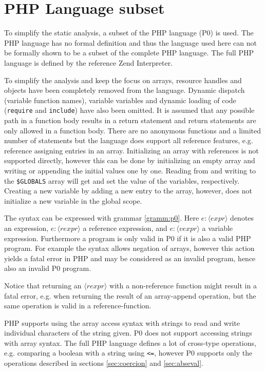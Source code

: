 \section{PHP Language subset}
\newcommand{\syn}[1]{\langle\mathit{#1}\rangle}
\label{sec:langsubset}
To simplify the static analysis, a subset of the PHP language (P0) is used. The PHP language has no formal definition and thus the language used here can not be formally shown to be a subset of the complete PHP language. The full PHP language is defined by the reference Zend Interpreter.

To simplify the analysis and keep the focus on arrays, resource handles and objects have been completely removed from the language. Dynamic dispatch (variable function names), variable variables and dynamic loading of code (\texttt{require} and \texttt{include}) have also been omitted. It is assumed that any possible path in a function body results in a return statement and return statements are only allowed in a function body. There are no anonymous functions and a limited number of statements but the language does support all reference features, e.g. reference assigning entries in an array. Initializing an array with references is not supported directly, however this can be done by initializing an empty array and writing or appending the initial values one by one. Reading from and writing to the \texttt{\$GLOBALS} array will get and set the value of the variables, respectively. Creating a new variable by adding a new entry to the array, however, does not initialize a new variable in the global scope.

The syntax can be expressed with grammar \ref{gramm:p0}. Here $e : \syn{expr}$ denotes an expression, $e : \syn{rexpr}$ a reference expression, and $e : \syn{vexpr}$ a variable expression.   Furthermore a program is only valid in P0 if it is also a valid PHP program. For example the syntax allows negation of arrays, however this action yields a fatal error in PHP and may be considered as an invalid program, hence also an invalid P0 program. 

Notice that returning an $\syn{rexpr}$ with a non-reference function might result in a fatal error, e.g. when returning the result of an array-append operation, but the same operation is valid in a reference-function.

PHP supports using the array access syntax with strings to read and write individual characters of the string given. P0 does not support accessing strings with array syntax. The full PHP language defines a lot of cross-type operations, e.g. comparing a boolean with a string using \texttt{<=}, however P0 supports only the operations described in sections \ref{sec:coercion} and \ref{sec:abseval}.

